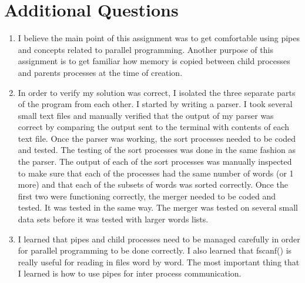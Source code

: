 \documentclass{article}
\begin{document}
\section{Additional Questions}
\begin{enumerate}
\item I believe the main point of this assignment was to get comfortable using pipes and concepts related to parallel programming.  Another purpose of this assignment is to get familiar how memory is copied between child processes and parents processes at the time of creation.
\item In order to verify my solution was correct, I isolated the three separate parts of the program from each other.  I started by writing a parser.  I took several small text files and manually verified that the output of my parser was correct by comparing the output sent to the terminal with contents of each text file.  Once the parser was working, the sort processes needed to be coded and tested.  The testing of the sort processes was done in the same fashion as the parser.  The output of each of the sort processes was manually inspected to make sure that each of the processes had the same number of words (or 1 more) and that each of the subsets of words was sorted correctly.  Once the first two were functioning correctly, the merger needed to be coded and tested.  It was tested in the same way.  The merger was tested on several small data sets before it was tested with larger words lists.
\item I learned that pipes and child processes need to be managed carefully in order for parallel programming to be done correctly.  I also learned that fscanf() is really useful for reading in files word by word.  The most important thing that I learned is how to use pipes for inter process communication.
\end{enumerate}
\end{document}
